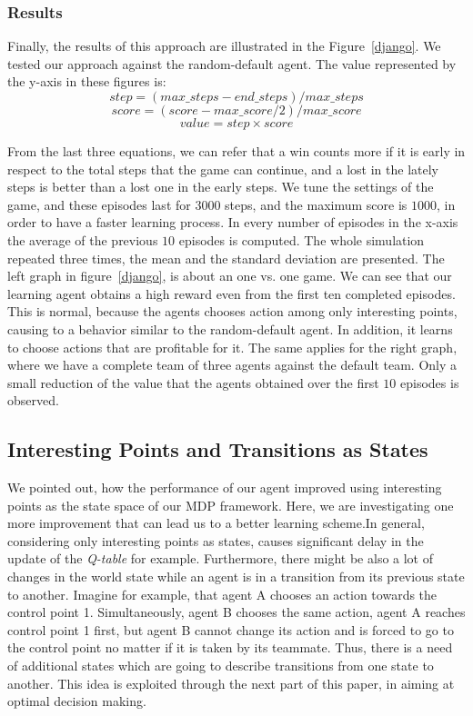 \documentclass[conference]{IEEEtran}
\begin{document}
\subsubsection{Results}
Finally, the results of this approach are illustrated in the Figure~\ref{django}. We tested our approach against the random-default agent. The value represented by the y-axis in these figures is:
\begin{equation}
step = (max\_steps - end\_steps)/ max\_steps
\end{equation}
\begin{equation}
score = (score - max\_score/2)/max\_score
\end{equation}
\begin{equation}
value = step \times score
\end{equation}

From the last three equations, we can refer that a win counts more if it is early in respect to the total steps that the game can continue, and a lost in the lately steps is better than a lost one in the early steps. We tune the settings of the game, and these episodes last for $3000$ steps, and the maximum score is $1000$, in order to have a faster learning process. In every number of episodes in the x-axis the average of the previous $10$ episodes is computed. The whole simulation repeated three times, the mean and the standard deviation are presented. The left graph in figure~\ref{django}, is about an one vs. one game. We can see that our learning agent obtains a high reward even from the first ten completed episodes. This is normal, because the agents chooses action among only interesting points, causing to a behavior similar to the random-default agent. In addition, it learns to choose actions that are profitable for it. The same applies for the right graph, where we have a complete team of three agents against the default team. Only a small reduction of the value that the agents obtained over the first $10$ episodes is observed.


\subsection{Interesting Points and Transitions as States}
We pointed out, how the performance of our agent improved using interesting points as the state space of our MDP framework. Here, we are investigating one more improvement that can lead us to a better learning scheme.In general, considering only interesting points as states, causes significant delay in the update of the \textit{Q-table} for example. Furthermore, there might be also a lot of changes in the world state while an agent is in a transition from its previous state to another. Imagine for example, that agent A chooses an action towards the control point 1. Simultaneously, agent B chooses the same action, agent A reaches control point 1 first, but agent B cannot change its action and is forced to go to the control point no matter if it is taken by its teammate. Thus, there is a need of additional states which are going to describe transitions from one state to another. This idea is exploited through the next part of this paper, in aiming at optimal decision making.
\end{document}

